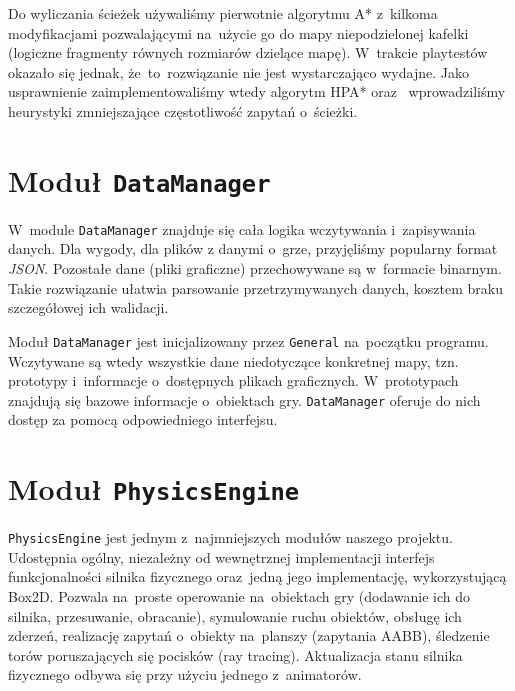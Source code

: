 \documentclass[licencjacka]{pracamgr}
\begin{document}
      Do wyliczania ścieżek używaliśmy pierwotnie algorytmu A*\cite{A*} z~kilkoma modyfikacjami pozwalającymi na~użycie go do mapy
      niepodzielonej kafelki (logiczne fragmenty równych rozmiarów dzielące mapę). W~trakcie playtestów okazało się jednak,
      że~to~rozwiązanie nie jest wystarczająco wydajne. Jako usprawnienie zaimplementowaliśmy wtedy algorytm HPA*\cite{HPA} oraz~
      wprowadziliśmy heurystyki zmniejszające częstotliwość zapytań o~ścieżki.


  \section{Moduł \texttt{DataManager}}
    W~module \texttt{DataManager} znajduje się cała logika wczytywania i~zapisywania danych. Dla wygody, dla plików z
    danymi o~grze, przyjęliśmy popularny format \emph{JSON}. Pozostałe dane (pliki graficzne) przechowywane są w~formacie
    binarnym. Takie rozwiązanie ułatwia parsowanie przetrzymywanych danych, kosztem braku szczegółowej ich walidacji.

    Moduł \texttt{DataManager} jest inicjalizowany przez \texttt{General} na~początku programu. Wczytywane są wtedy wszystkie dane
    niedotyczące konkretnej mapy, tzn. prototypy i~informacje o~dostępnych plikach graficznych. W~prototypach znajdują się 
    bazowe informacje o~obiektach gry. \texttt{DataManager} oferuje do nich dostęp za pomocą odpowiedniego interfejsu.

  \section{Moduł \texttt{PhysicsEngine}}
    \texttt{PhysicsEngine} jest jednym z~najmniejszych modułów naszego projektu. Udostępnia ogólny, niezależny od
    wewnętrznej implementacji interfejs funkcjonalności silnika fizycznego oraz~jedną jego implementację, wykorzystującą Box2D.
    Pozwala na~proste operowanie na~obiektach gry (dodawanie ich do silnika, przesuwanie, obracanie), symulowanie ruchu obiektów,
    obsługę ich zderzeń, realizację zapytań o~obiekty na~planszy (zapytania AABB), śledzenie torów poruszających się pocisków (ray tracing).
    Aktualizacja stanu silnika fizycznego odbywa się przy użyciu jednego z~animatorów.
\end{document}
